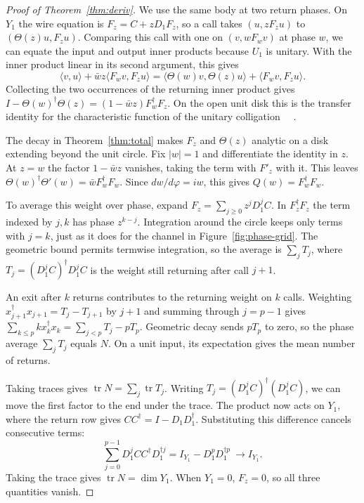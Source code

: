 \documentclass[acmsmall,screen,review,anonymous,nonacm]{acmart}
\newcommand{\tr}{\operatorname{tr}}
\numberwithin{equation}{section}
\begin{document}
\begin{proof}[Proof of Theorem~\ref{thm:deriv}]
\setlength{\parindent}{\appendixindent}
We use the same body at two return phases. On $Y_1$ the wire equation
is $F_z=C+zD_1F_z$, so a call takes $(u,zF_z u)$ to
$(\Theta(z)u,F_z u)$. Comparing this call with one on $(v,wF_wv)$ at phase $w$, we can
equate the input and output inner products because $U_1$ is unitary.
With the inner product linear in its second argument, this gives
\[
 \langle v,u\rangle+\bar w z\langle F_wv,F_zu\rangle
 =\langle\Theta(w)v,\Theta(z)u\rangle+\langle F_wv,F_zu\rangle .
\]
Collecting the two occurrences of the returning inner product gives
$I-\Theta(w)^\dagger\Theta(z)=(1-\bar w z)F_w^\dagger F_z$.
On the open unit disk this is the transfer identity for the characteristic
function of the unitary colligation~\cite{Brodskii78}
~\cite[Eq.~(4.10)]{BehrndtHassiSnoo09Colligations}.

The decay in Theorem~\ref{thm:total} makes $F_z$ and $\Theta(z)$
analytic on a disk extending beyond the unit circle. Fix $|w|=1$
and differentiate the identity in $z$. At $z=w$ the factor
$1-\bar w z$ vanishes, taking the term with $F'_z$ with it. This leaves
$\Theta(w)^\dagger\Theta'(w)=\bar w F_w^\dagger F_w$.
Since $dw/d\varphi=iw$, this gives $Q(w)=F_w^\dagger F_w$.

To average this weight over phase, expand $F_z=\sum_{j\ge0}z^jD_1^jC$.
In $F_z^\dagger F_z$ the term indexed by $j,k$ has phase $z^{k-j}$.
Integration around the circle keeps only terms with $j=k$, just as it
does for the channel in Figure~\ref{fig:phase-grid}. The geometric bound permits termwise
integration, so the average is $\sum_j T_j$, where
$T_j=(D_1^jC)^\dagger D_1^jC$ is the weight still returning after call $j+1$.

An exit after $k$ returns contributes to the returning weight on $k$ calls.
Weighting $x_{j+1}^\dagger x_{j+1}=T_j-T_{j+1}$ by $j+1$ and summing through
$j=p-1$ gives $\sum_{k\le p} k x_k^\dagger x_k=\sum_{j<p}T_j-pT_p$.
Geometric decay sends $pT_p$ to zero, so the phase average $\sum_j T_j$
equals $N$. On a unit input, its expectation gives the mean number of returns.

Taking traces gives $\tr N=\sum_j\tr T_j$. Writing $T_j=(D_1^j C)^\dagger(D_1^j C)$, we can move the first factor
to the end under the trace. The product now acts on $Y_1$, where the return row gives $CC^\dagger=I-D_1D_1^\dagger$.
Substituting this difference cancels consecutive terms:
\[
 \sum_{j=0}^{p-1} D_1^j CC^\dagger D_1^{\dagger j}
 = I_{Y_1}-D_1^pD_1^{\dagger p}\ \longrightarrow I_{Y_1}.
\]
Taking the trace gives $\tr N=\dim Y_1$. When $Y_1=0$, $F_z=0$,
so all three quantities vanish.
\end{proof}
\end{document}
